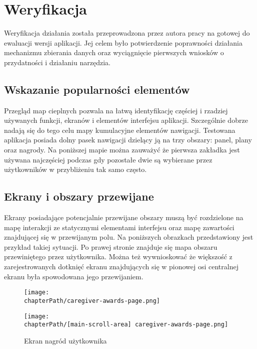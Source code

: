 \section{Weryfikacja}
Weryfikacja działania została przeprowadzona przez autora pracy na gotowej do ewaluacji wersji aplikacji. Jej celem było potwierdzenie poprawności działania mechanizmu zbierania danych oraz wyciągnięcie pierwszych wniosków o przydatności i działaniu narzędzia.

\subsection{Wskazanie popularności elementów}
Przegląd map cieplnych pozwala na łatwą identyfikację częściej i rzadziej używanych funkcji, ekranów i elementów interfejsu aplikacji. Szczególnie dobrze nadają się do tego celu mapy kumulacyjne elementów nawigacji. Testowana aplikacja posiada dolny pasek nawigacji dzielący ją na trzy obszary: panel, plany oraz nagrody. Na poniższej mapie można zauważyć że pierwsza zakładka jest używana najczęściej podczas gdy pozostałe dwie są wybierane przez użytkowników w przybliżeniu tak samo często.

\bigskip
{}

\subsection{Ekrany i obszary przewijane}
Ekrany posiadające potencjalnie przewijane obszary muszą być rozdzielone na mapę interakcji ze statycznymi elementami interfejsu oraz mapę zawartości znajdującej się w przewijanym polu. Na poniższych obrazkach przedstawiony jest przykład takiej sytuacji. Po prawej stronie znajduje się mapa obszaru przewiniętego przez użytkownika. Można też wywnioskować że większość z zarejestrowanych dotknięć ekranu znajdujących się w pionowej osi centralnej ekranu była spowodowana jego przewijaniem. 

\bigskip
\begin{figure}[H]
\centering
\begin{minipage}{.35\textwidth}
	\centering
	\texttt{[image: \\chapterPath/caregiver-awards-page.png]}
\end{minipage}
\begin{minipage}{.3\textwidth}
	\centering
	\texttt{[image: \\chapterPath/[main-scroll-area] caregiver-awards-page.png]}
\end{minipage}
\bigskip
\caption{Ekran nagród użytkownika}
\label{fig:rs_panel_parts}
\end{figure}

